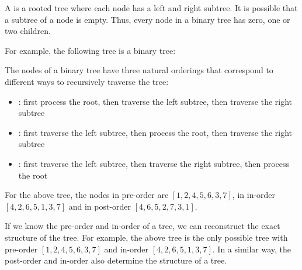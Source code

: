 
\begin{samepage}
A  is a rooted tree
where each node has a left and right subtree.
It is possible that a subtree of a node is empty.
Thus, every node in a binary tree has
zero, one or two children.

For example, the following tree is a binary tree:
\begin{center}
\end{center}
\end{samepage}


The nodes of a binary tree have three natural
orderings that correspond to different ways to 
recursively traverse the tree:

\begin{itemize}
\item {}: first process the root,
then traverse the left subtree, then traverse the right subtree
\item {}: first traverse the left subtree,
then process the root, then traverse the right subtree
\item {}: first traverse the left subtree,
then traverse the right subtree, then process the root
\end{itemize}

For the above tree, the nodes in
pre-order are
$[1,2,4,5,6,3,7]$,
in in-order $[4,2,6,5,1,3,7]$
and in post-order $[4,6,5,2,7,3,1]$.

If we know the pre-order and in-order
of a tree, we can reconstruct the exact structure of the tree.
For example, the above tree is the only possible tree
with pre-order $[1,2,4,5,6,3,7]$ and
in-order $[4,2,6,5,1,3,7]$.
In a similar way, the post-order and in-order
also determine the structure of a tree.

